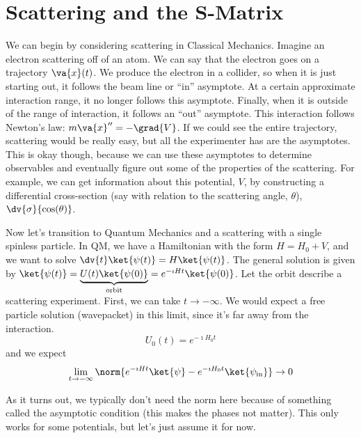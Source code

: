 \documentclass[a4paper,twoside,master.tex]{subfiles}
\begin{document}

\section{Scattering and the S-Matrix}
\label{sec:scattering_and_the_s_matrix}

We can begin by considering scattering in Classical Mechanics. Imagine an electron scattering off of an atom. We can say that the electron goes on a trajectory $ \va{x}(t) $. We produce the electron in a collider, so when it is just starting out, it follows the beam line or ``in'' asymptote. At a certain approximate interaction range, it no longer follows this asymptote. Finally, when it is outside of the range of interaction, it follows an ``out'' asymptote. This interaction follows Newton's law: $ m \va{x}'' = - \grad{V} $. If we could see the entire trajectory, scattering would be really easy, but all the experimenter has are the asymptotes. This is okay though, because we can use these asymptotes to determine observables and eventually figure out some of the properties of the scattering. For example, we can get information about this potential, $ V $, by constructing a differential cross-section (say with relation to the scattering angle, $ \theta $), $ \dv{\sigma}{\cos(\theta)} $.


Now let's transition to Quantum Mechanics and a scattering with a single spinless particle. In QM, we have a Hamiltonian with the form $ H = H_0 + V $, and we want to solve $ \dv{t}\ket{\psi(t)} = H\ket{\psi(t)} $. The general solution is given by $\ket{\psi(t)} = \underbrace{U(t)\ket{\psi(0)}}_{\text{orbit}} = e^{- \imath H t}\ket{\psi(0)} $. Let the orbit describe a scattering experiment. First, we can take $ t \to - \infty $. We would expect a free particle solution (wavepacket) in this limit, since it's far away from the interaction. 
\begin{equation}
    U_0(t) = e^{- \imath H_0 t}
\end{equation}
and we expect
\begin{equation}
    \lim_{t \to - \infty} \norm{e^{- \imath H t}\ket{\psi} - e^{- \imath H_0 t}\ket{\psi_{\text{in}}}} \to 0
\end{equation}

As it turns out, we typically don't need the norm here because of something called the asymptotic condition (this makes the phases not matter). This only works for some potentials, but let's just assume it for now.
\end{document}

